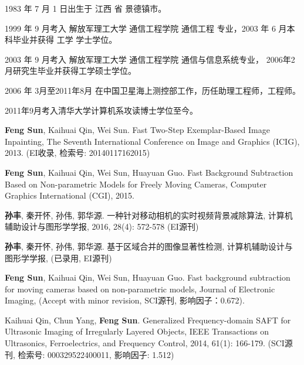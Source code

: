 \begin{resume}


  1983 年 7 月 1 日出生于 江西 省 景德镇市。

  1999 年 9 月考入 解放军理工大学 通信工程学院  通信工程 专业，2003 年 6 月本科毕业并获得 工学 学士学位。

  2003 年 9 月考入 解放军理工大学 通信工程学院 通信与信息系统专业， 2006年2月研究生毕业并获得工学硕士学位。

  2006 年 3月至2011年8月 在中国卫星海上测控部工作，历任助理工程师，工程师。

  2011年9月考入清华大学计算机系攻读博士学位至今。




  \begin{publications}
    \item {\bf Feng Sun}, Kaihuai Qin, Wei Sun. Fast Two-Step Exemplar-Based Image Inpainting,
   The Seventh International Conference on Image and Graphics (ICIG), 2013. (EI收录, 检索号: 20140117162015)
    \item  {\bf Feng Sun}, Kaihuai Qin, Wei Sun, Huayuan Guo. Fast Background Subtraction Based on Non-parametric Models for Freely Moving Cameras,
    Computer Graphics International (CGI), 2015.
    \item {\bf 孙丰}, 秦开怀, 孙伟, 郭华源. 一种针对移动相机的实时视频背景减除算法, 计算机辅助设计与图形学学报, 2016, 28(4): 572-578 (EI源刊)
  \end{publications}

  \begin{publications}[before=\publicationskip,after=\publicationskip]

    \item {\bf 孙丰}, 秦开怀, 孙伟, 郭华源. 基于区域合并的图像显著性检测, 计算机辅助设计与图形学学报, (已录用, EI源刊)
    \item  {\bf Feng Sun}, Kaihuai Qin, Wei Sun, Huayuan Guo. Fast background subtraction for moving cameras based on non-parametric models,
    Journal of Electronic Imaging, (Accept with minor revision, SCI源刊, 影响因子：0.672).
  \end{publications}

  \begin{publications}
    \item  Kaihuai Qin, Chun Yang, {\bf Feng Sun}. Generalized Frequency-domain SAFT for Ultrasonic Imaging of Irregularly Layered Objects,
    IEEE Transactions on Ultrasonics, Ferroelectrics, and Frequency Control, 2014, 61(1): 166-179. (SCI源刊, 检索号: 000329522400011, 影响因子: 1.512)





\end{publications}
\end{resume}
